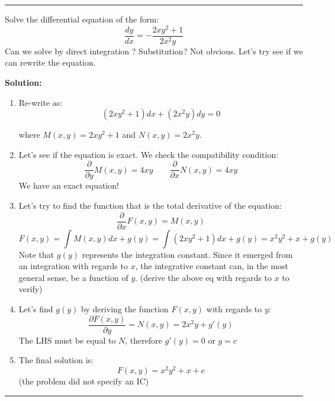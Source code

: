 \begin{center}
\noindent\rule{4cm}{0.4pt}
\end{center}

\begin{exmp}{}
Solve the differential equation of the form:
\begin{equation*}
\frac{dy}{dx}=-\frac{2xy^{2}+1}{2x^{2}y}
\end{equation*}
Can we solve by direct integration ? Substitution? Not obvious. Let's try see if we can rewrite the equation.

\textbf{Solution:}
\begin{enumerate}

\item   Re-write as:
\begin{equation*}
({2xy^{2}+1})dx+(2x^{2}y)dy=0
\end{equation*}

where $M(x,y)={2xy^{2}+1}$ and $N(x,y)=2x^{2}y$.
\item Let's see if the equation is exact. We check the compatibility condition:
\begin{equation*}
\frac{\partial}{\partial y}M(x,y)= 4xy \qquad
\frac{\partial}{\partial x}N(x,y)=4xy
\end{equation*}
We have an exact equation!

\item Let's try to find the function that is the total derivative of the equation:
\begin{equation*}
\frac{\partial}{\partial x} F(x,y)=M(x,y)
\end{equation*}
\begin{equation*}
F(x,y)=\int M(x,y) dx + g(y)=\int ({2xy^{2}+1})dx +g(y)=x^2y^2+x+g(y)
\end{equation*}
Note that $g(y)$ represents the integration constant. Since it emerged from an integration with regards to $x$, the integrative constant can, in the most general sense, be a function of $y$. (derive the above eq with regards to $x$ to verify)
\item  Let's find $g(y)$ by deriving the function $F(x,y)$ with regards to $y$:
\begin{equation*}
\frac{\partial F(x,y)}{\partial y}= N(x,y)= 2x^2y+g'(y)
\end{equation*}
The LHS must be equal to $N$, therefore $g'(y)=0$ or $g=c$
\item The final solution is:
\begin{equation*}
\boxed{F(x,y)=x^2y^2+x+c}
\end{equation*}
(the problem did not specify an IC)
\end{enumerate}
\end{exmp}

\begin{center}
\noindent\rule{4cm}{0.4pt}
\end{center}
\updateinfo[September 19, 2018]

